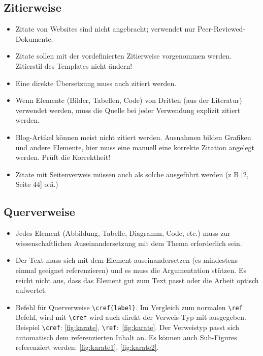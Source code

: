 \subsection*{Zitierweise}
\begin{itemize}
    \item Zitate von Websites sind nicht angebracht; verwendet nur Peer-Reviewed-Dokumente.
    \item Zitate sollen mit der vordefinierten Zitierweise vorgenommen werden. Zitierstil des Templates nicht ändern!
    \item Eine direkte Übersetzung muss auch zitiert werden.
    \item Wenn Elemente (Bilder, Tabellen, Code) von Dritten (aus der Literatur) verwendet werden, muss die Quelle bei jeder Verwendung explizit zitiert werden.
    \item Blog-Artikel können meist nicht zitiert werden. Ausnahmen bilden Grafiken und andere Elemente, hier muss eine manuell eine korrekte Zitation angelegt werden. Prüft die Korrektheit!
    \item  Zitate mit Seitenverweis müssen auch als solche ausgeführt werden (z B [2, Seite 44] o.ä.)
\end{itemize}

\subsection*{Querverweise}
\begin{itemize}
    \item  Jedes Element (Abbildung, Tabelle, Diagramm, Code, etc.) muss zur wissenschaftlichen Auseinandersetzung mit dem Thema erforderlich sein.
    \item Der Text muss sich mit dem Element auseinandersetzen (es mindestens einmal geeignet referenzieren) und es muss die Argumentation stützen. Es reicht nicht aus, dass das Element gut zum Text passt oder die Arbeit optisch aufwertet.
    \item Befehl für Querverweise {\lstset{basicstyle=\ttfamily\bfseries}\lstinline|\cref{label}|}. Im Vergleich zum normalen {\lstset{basicstyle=\ttfamily\bfseries}\lstinline|\ref|} Befehl, wird mit {\lstset{basicstyle=\ttfamily\bfseries}\lstinline|\cref|} wird auch direkt der Verweis-Typ mit ausgegeben. Beispiel {\lstset{basicstyle=\ttfamily\bfseries}\lstinline|\cref|}: \cref{fig:karate}, {\lstset{basicstyle=\ttfamily\bfseries}\lstinline|\ref|}:~\ref{fig:karate}. Der Verweistyp passt sich automatisch dem referenzierten Inhalt an. Es können auch Sub-Figures referenziert werden: \cref{fig:karate1}, \cref{fig:karate2}.
\end{itemize}